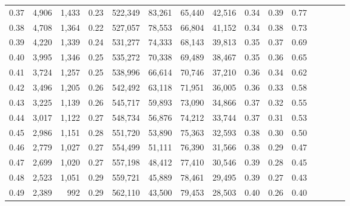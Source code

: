 \begin{tabular}{rrrcrrrrrrrrrrr}
0.37 &   4,906 &  1,433 &                                       0.23 &  522,349 &   83,261 &   65,440 &   42,516 &  0.34 &  0.39 &                         0.77 \\
0.38 &   4,708 &  1,364 &                                       0.22 &  527,057 &   78,553 &   66,804 &   41,152 &  0.34 &  0.38 &                         0.73 \\
0.39 &   4,220 &  1,339 &                                       0.24 &  531,277 &   74,333 &   68,143 &   39,813 &  0.35 &  0.37 &                         0.69 \\
0.40 &   3,995 &  1,346 &                                       0.25 &  535,272 &   70,338 &   69,489 &   38,467 &  0.35 &  0.36 &                         0.65 \\
0.41 &   3,724 &  1,257 &                                       0.25 &  538,996 &   66,614 &   70,746 &   37,210 &  0.36 &  0.34 &                         0.62 \\
0.42 &   3,496 &  1,205 &                                       0.26 &  542,492 &   63,118 &   71,951 &   36,005 &  0.36 &  0.33 &                         0.58 \\
0.43 &   3,225 &  1,139 &                                       0.26 &  545,717 &   59,893 &   73,090 &   34,866 &  0.37 &  0.32 &                         0.55 \\
0.44 &   3,017 &  1,122 &                                       0.27 &  548,734 &   56,876 &   74,212 &   33,744 &  0.37 &  0.31 &                         0.53 \\
0.45 &   2,986 &  1,151 &                                       0.28 &  551,720 &   53,890 &   75,363 &   32,593 &  0.38 &  0.30 &                         0.50 \\
0.46 &   2,779 &  1,027 &                                       0.27 &  554,499 &   51,111 &   76,390 &   31,566 &  0.38 &  0.29 &                         0.47 \\
0.47 &   2,699 &  1,020 &                                       0.27 &  557,198 &   48,412 &   77,410 &   30,546 &  0.39 &  0.28 &                         0.45 \\
0.48 &   2,523 &  1,051 &                                       0.29 &  559,721 &   45,889 &   78,461 &   29,495 &  0.39 &  0.27 &                         0.43 \\
0.49 &   2,389 &    992 &                                       0.29 &  562,110 &   43,500 &   79,453 &   28,503 &  0.40 &  0.26 &                         0.40 \\

\end{tabular}
